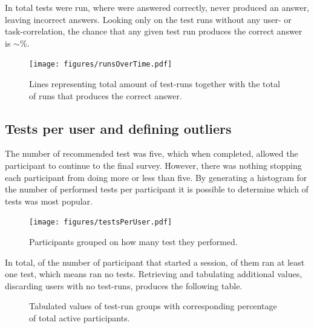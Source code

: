 \documentclass[nofilelist,dvipsnames]{cslthse-msc}
\begin{document}
				In total  tests were run, where
				 were answered correctly,
				 never produced an answer, leaving
				 incorrect answers. Looking only on the test
				runs without any user- or task-correlation, the chance that any given test run
				produces the correct answer is $\sim$\%.

				\begin{figure}[h!]
					\centering
					\texttt{[image: figures/runsOverTime.pdf]}
          \vspace{-0.3cm}
          \caption{Lines representing total amount of test-runs together with
            the total of runs that produces the correct answer.}
          \vspace{-0.4cm}
				\end{figure}

			\subsection{Tests per user and defining outliers}

				The number of recommended test was five, which when completed, allowed
				the participant to continue to the final survey. However, there was
				nothing stopping each participant from doing more or less than five.
        By generating a histogram for the number of performed tests per
        participant it is possible to determine which of tests was most
        popular.

				\begin{figure}[h!]
					\centering
					\texttt{[image: figures/testsPerUser.pdf]}
					\caption{Participants grouped on how many test they performed.}
				\end{figure}

        In total, of the  number of participant that
        started a session,  of them ran at least one
        test, which means  ran no tests. Retrieving and
        tabulating additional values, discarding users with no test-runs,
        produces the following table.

        \begin{figure}[h!]
          \centering
          \caption{
            Tabulated values of test-run groups with corresponding percentage
            of total active participants.
          }
        \end{figure}
\end{document}
